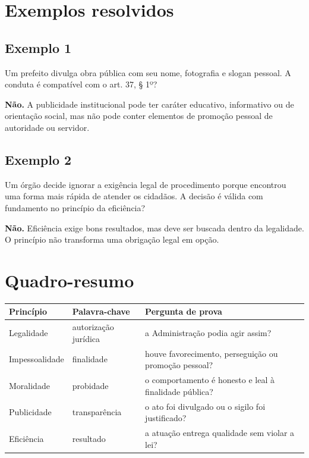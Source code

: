 \documentclass[11pt,a4paper]{article}
\begin{document}
\section*{Exemplos resolvidos}

\subsection*{Exemplo 1}

Um prefeito divulga obra pública com seu nome, fotografia e slogan pessoal. A conduta é compatível com o art. 37, § 1º?

\textbf{Não.} A publicidade institucional pode ter caráter educativo, informativo ou de orientação social, mas não pode conter elementos de promoção pessoal de autoridade ou servidor.

\subsection*{Exemplo 2}

Um órgão decide ignorar a exigência legal de procedimento porque encontrou uma forma mais rápida de atender os cidadãos. A decisão é válida com fundamento no princípio da eficiência?

\textbf{Não.} Eficiência exige bons resultados, mas deve ser buscada dentro da legalidade. O princípio não transforma uma obrigação legal em opção.

\section*{Quadro-resumo}

\begin{tabularx}{\linewidth}{llX}
\toprule
 \textbf{Princípio} & \textbf{Palavra-chave} & \textbf{Pergunta de prova} \\
\midrule
 Legalidade & autorização jurídica & a Administração podia agir assim? \\
 Impessoalidade & finalidade & houve favorecimento, perseguição ou promoção pessoal? \\
 Moralidade & probidade & o comportamento é honesto e leal à finalidade pública? \\
 Publicidade & transparência & o ato foi divulgado ou o sigilo foi justificado? \\
 Eficiência & resultado & a atuação entrega qualidade sem violar a lei? \\
\bottomrule
\end{tabularx}
\end{document}
